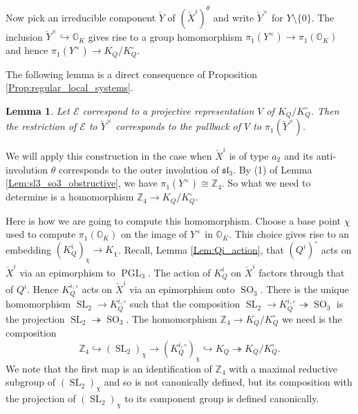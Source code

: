 \documentclass[12pt]{amsart}
\newcommand{\Orb}{\mathbb{O}}
\newcommand{\Z}{\mathbb{Z}}
\newcommand{\SL}{\operatorname{SL}}
\newtheorem{Lem}[Thm]{Lemma}
\theoremstyle{definition}
\numberwithin{equation}{section}
\begin{document}
Now pick an irreducible component $\check{Y}$ of $(\check{X}^{i})^\theta$ and write
$\check{Y}^\times$ for $Y\setminus \{0\}$. The inclusion $\check{Y}^\times\hookrightarrow \Orb_K$
gives rise to a group homomorphism $\pi_1(Y^\times)\rightarrow \pi_1(\Orb_K)$ and hence
$\pi_1(Y^\times)\rightarrow K_Q/K_Q^\circ$.

The following lemma is a direct consequence of Proposition \ref{Prop:regular_local_systems}.

\begin{Lem}\label{Lem:local_sys_restr1}
Let $\mathcal{E}$ correspond to a projective representation $V$ of $K_Q/K_Q^\circ$.
Then the restriction of $\mathcal{E}$ to $\check{Y}^\times$ corresponds to the pullback of
$V$ to $\pi_1(\check{Y}^\times)$.
\end{Lem}

We will apply this construction in the case when $\check{X}^i$ is of type $a_2$
and its anti-involution $\theta$ corresponds to the outer involution of $\mathfrak{sl}_3$.
By (1) of Lemma \ref{Lem:sl3_so3_obstructive}, we have $\pi_1(Y^\times)\cong \Z_4$.
So what we need to determine is a homomorphism $\Z_4\rightarrow K_Q/K_Q^\circ$.

Here is how we are going to compute this homomorphism.
Choose a base point $\chi$ used
to compute $\pi_1(\Orb_K)$ on the image of $Y^\times$ in $\Orb_K$.
This choice gives rise to an embedding $(K_{Q}^i)_\chi\rightarrow K_\chi$.
Recall, Lemma \ref{Lem:Qi_action}, that $(Q^i)^\circ$ acts on $\check{X}^i$ via an epimorphism to $\operatorname{PGL}_3$.
The action of $K_Q^i$ on $\check{X}^i$ factors through that of $Q^i$.
Hence $K_{Q}^{i,\circ}$ acts on $\check{X}^i$ via an epimorphism onto $\operatorname{SO}_3$. There is the unique homomorphism
$\operatorname{SL}_2 \rightarrow K_{Q}^{i,\circ} $ such that the composition
$\operatorname{SL}_2 \to K_{Q}^{i,\circ} \twoheadrightarrow \operatorname{SO}_3$
is the projection $\operatorname{SL}_2\twoheadrightarrow \operatorname{SO}_3$.
The homomorphism $\Z_4\rightarrow K_Q/K_Q^\circ$ we need is the composition 
\begin{equation} \label{eq:hom_Z4}
	\Z_4\hookrightarrow (\SL_2)_\chi \rightarrow (K_{Q}^{i,\circ})_\chi\hookrightarrow K_Q\twoheadrightarrow K_Q/K_Q^\circ.
\end{equation}
We note that the first map is an identification of $\Z_4$ with a maximal reductive subgroup of $(\SL_2)_\chi$
and so is not canonically defined, but its composition with the projection of 
$(\SL_2)_\chi$ to its component group is defined canonically. 
\end{document}
